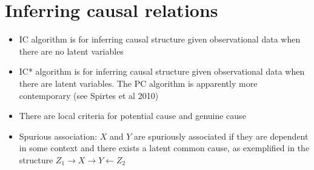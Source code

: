 \documentclass[11pt]{article}
\numberwithin{equation}{section}
\begin{document}
\section{Inferring causal relations}
\begin{itemize}
\item IC algorithm is for inferring causal structure given observational data when there are no latent variables
\item IC* algorithm is for inferring causal structure given observational data when there are latent variables. The PC algorithm is apparently more contemporary (see Spirtes et al 2010)
\item There are local criteria for potential cause and genuine cause
\item Spurious association: $X$ and $Y$ are spuriously associated if they are dependent in some context and there exists a latent common cause, as exemplified in the structure $Z_1 \rightarrow X \rightarrow Y \leftarrow Z_2$
\end{itemize}
\end{document}
